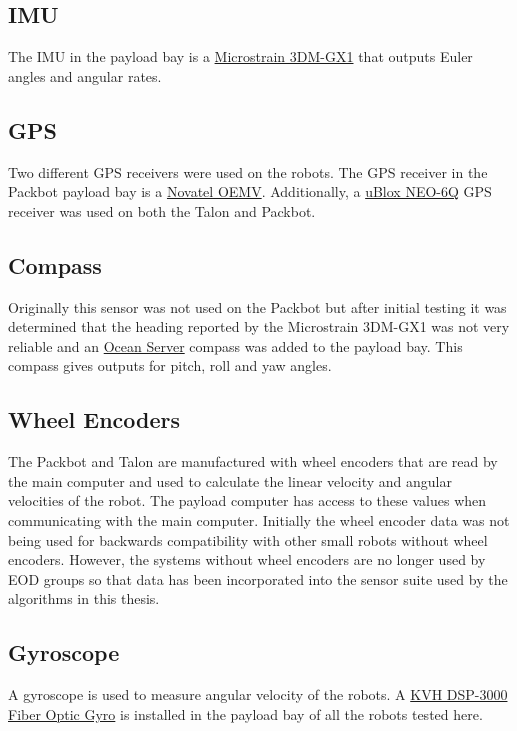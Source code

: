 \subsection{IMU}
\label{sec:bgIMU}
The IMU in the payload bay is a \href{http://www.microstrain.com/3dm-gx1.aspx}{Microstrain 3DM-GX1} that outputs Euler angles and angular rates.

\subsection{GPS}
\label{sec:bgGPS}
Two different GPS receivers were used on the robots. The GPS receiver in the Packbot payload bay is a \href{http://www.novatel.com/products/gnss-receivers/oem-receiver-boards/oemv-receivers/}{Novatel OEMV}. Additionally, a \href{http://www.u-blox.com/gps-modules.html}{uBlox NEO-6Q} GPS receiver was used on both the Talon and Packbot.

\subsection{Compass}
\label{sec:bgCompass}
Originally this sensor was not used on the Packbot but after initial testing it was determined that the heading reported by the Microstrain 3DM-GX1 was not very reliable and an \href{http://www.oceanserver-store.com/os3axdico3.html}{Ocean Server} compass was added to the payload bay. This compass gives outputs for pitch, roll and yaw angles.

\subsection{Wheel Encoders}
\label{sec:bgEncoders}
The Packbot and Talon are manufactured with wheel encoders that are read by the main computer and used to calculate the linear velocity and angular velocities of the robot. The payload computer has access to these values when communicating with the main computer. Initially the wheel encoder data was not being used for backwards compatibility with other small robots without wheel encoders. However, the systems without wheel encoders are no longer used by EOD groups so that data has been incorporated into the sensor suite used by the algorithms in this thesis.

\subsection{Gyroscope}
\label{sec:bgGyro}
A gyroscope is used to measure angular velocity of the robots. A \href{http://www.kvh.com/Commercial-and-OEM/Gyros-and-Inertial-Systems-and-Compasses/Gyros-and-IMUs-and-INS/Fiber-Optic-Gyros/DSP-3000.aspx}{KVH DSP-3000 Fiber Optic Gyro} is installed in the payload bay of all the robots tested here.

